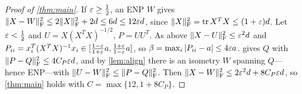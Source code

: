 \begin{proof}[Proof of \cref{thm:main}]
If $\varepsilon\ge\frac12$, an ENP $W$ gives $\lVert X-W\rVert_{\mathrm F}^2\le2\lVert X\rVert_{\mathrm F}^2+2d\le6d\le12\varepsilon
d$, since $\lVert X\rVert_{\mathrm F}^2=\operatorname{tr} X^TX\le(1+\varepsilon)d$. Let $\varepsilon<\frac12$ and
$U=X(X^TX)^{-1/2}$, $P=UU^T$. As above $\lVert X-U\rVert_{\mathrm F}^2\le\varepsilon^2d$ and
$P_{ii}=x_i^T(X^TX)^{-1}x_i\in[\frac{1-\varepsilon}{1+\varepsilon}a,\frac{1+\varepsilon}{1-\varepsilon}a]$, so
$\beta=\max_i|P_{ii}-a|\le4\varepsilon a$.  gives $Q$ with
$\lVert P-Q\rVert_{\mathrm F}^2\le4C_P\varepsilon d$, and by \cref{lem:align} there is an isometry $W$
spanning $Q$---hence ENP---with $\lVert U-W\rVert_{\mathrm F}^2\le\lVert P-Q\rVert_{\mathrm F}^2$. Then
$\lVert X-W\rVert_{\mathrm F}^2\le2\varepsilon^2d+8C_P\varepsilon d$, so \cref{thm:main} holds with
$C=\max\{12,1+8C_P\}$.
\end{proof}
